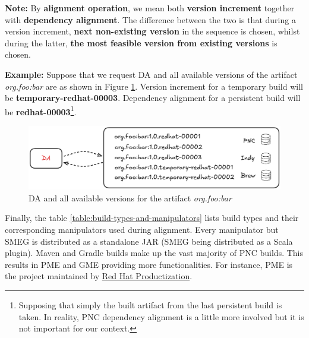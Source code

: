\documentclass[../main.tex]{subfiles}
\begin{document}
\textbf{Note:} By \textbf{alignment operation}, we mean both \textbf{version increment} together with \textbf{dependency alignment}. The difference between the two is that during a version increment, \textbf{next non-existing version} in the sequence is chosen, whilst during the latter, \textbf{the most feasible version from existing versions} is chosen.

\textbf{Example:} Suppose that we request DA and all available versions of the artifact \textit{org.foo:bar} are as shown in Figure \ref{fig:version-increment-vs-dependency-alignment}. Version increment for a temporary build will be \textbf{temporary-redhat-00003}. Dependency alignment for a persistent build will be \textbf{redhat-00003}\footnote{Supposing that simply the built artifact from the last persistent build is taken. In reality, PNC dependency alignment is a little more involved but it is not important for our context.}.

\begin{figure}
  \begin{center}
    \includegraphics[width=\textwidth]{images/version-increment-vs-dependency-alignment.png}
  \end{center}
  \caption{DA and all available versions for the artifact \textit{org.foo:bar}}
  \label{fig:version-increment-vs-dependency-alignment}
\end{figure}

Finally, the table \ref{table:build-types-and-manipulators} lists build types and their corresponding manipulators used during alignment. Every manipulator but SMEG is distributed as a standalone JAR (SMEG being distributed as a Scala plugin). Maven and Gradle builds make up the vast majority of PNC builds. This results in PME and GME providing more functionalities. For instance, PME is the project maintained by \href{https://github.com/release-engineering}{Red Hat Productization}.
\end{document}
